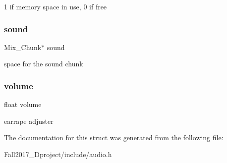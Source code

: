 1 if memory space in use, 0 if free \mbox{\label{structsound__s_a0bb45d52afdd032f48e17a8519361d54}} 
\subsubsection{\texorpdfstring{sound}{sound}}
{\footnotesize\ttfamily Mix\+\_\+\+Chunk$\ast$ sound}

space for the sound chunk \mbox{\label{structsound__s_a016abda2855c77dcc1630f9d2f9f8d18}} 
\subsubsection{\texorpdfstring{volume}{volume}}
{\footnotesize\ttfamily float volume}

earrape adjuster 

The documentation for this struct was generated from the following file\+:\begin{DoxyCompactItemize}
\item 
Fall2017\+\_\+Dproject/include/audio.\+h\end{DoxyCompactItemize}
